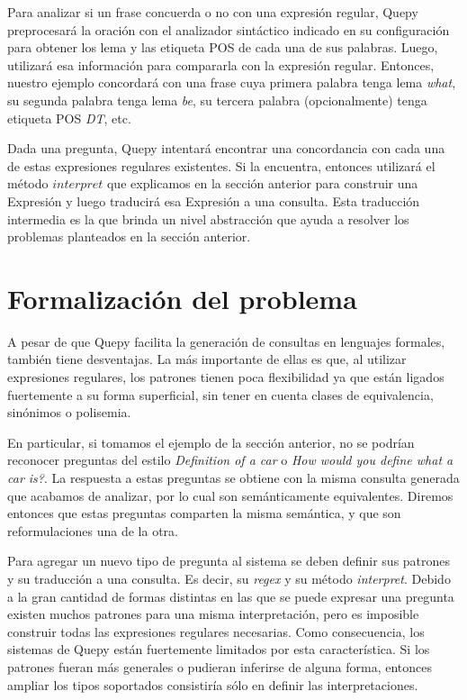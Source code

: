 Para analizar si un frase concuerda o no con una expresión regular, Quepy preprocesará la oración con el analizador sintáctico indicado en su configuración para obtener los lema y las etiqueta POS de cada una de sus palabras. Luego, utilizará esa información para compararla con la expresión regular. Entonces, nuestro ejemplo concordará con una frase cuya primera palabra tenga lema \textit{what}, su segunda palabra tenga lema \textit{be}, su tercera palabra (opcionalmente) tenga etiqueta POS \textit{DT}, etc.

Dada una pregunta, Quepy intentará encontrar una concordancia con cada una de estas expresiones regulares existentes. Si la encuentra, entonces utilizará el método $interpret$ que explicamos en la sección anterior para construir una Expresión y luego traducirá esa Expresión a una consulta. Esta traducción intermedia es la que brinda un nivel abstracción que ayuda a resolver los problemas planteados en la sección anterior.

\chapter{Formalización del problema}

A pesar de que Quepy facilita la generación de consultas en lenguajes formales, también tiene desventajas. La más importante de ellas es que, al utilizar expresiones regulares, los patrones tienen poca flexibilidad ya que están ligados fuertemente a su forma superficial, sin tener en cuenta clases de equivalencia, sinónimos o polisemia.

En particular, si tomamos el ejemplo de la sección anterior, no se podrían reconocer preguntas del estilo \textit{Definition of a car} o \textit{How would you define what a car is?}. La respuesta a estas preguntas se obtiene con la misma consulta generada que acabamos de analizar, por lo cual son semánticamente equivalentes. Diremos entonces que estas preguntas comparten la misma semántica, y que son reformulaciones una de la otra.

Para agregar un nuevo tipo de pregunta al sistema se deben definir sus patrones y su traducción a una consulta. Es decir, su \textit{regex} y su método \textit{interpret}. Debido a la gran cantidad de formas distintas en las que se puede expresar una pregunta existen muchos patrones para una misma interpretación, pero es imposible construir todas las expresiones regulares necesarias. Como consecuencia, los sistemas de Quepy están fuertemente limitados por esta característica. Si los patrones fueran más generales o pudieran inferirse de alguna forma, entonces ampliar los tipos soportados consistiría sólo en definir las interpretaciones.

